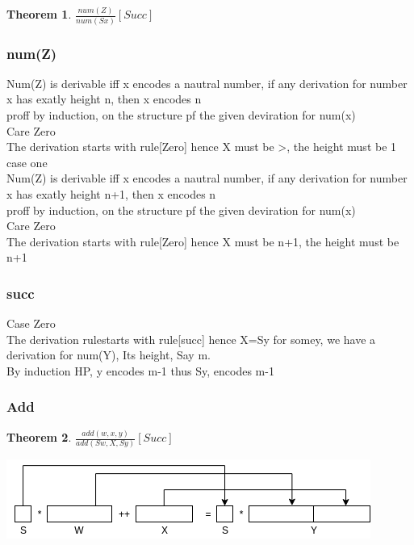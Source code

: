 \documentclass[a4paper,10pt,titlepage]{report}
\newtheorem{theorem}{Theorem}
\begin{document}
\begin{theorem}

$\frac{num(Z)}{num(Sx)}[Succ]$

\end{theorem}
\subsubsection{num(Z)}
Num(Z) is derivable iff x encodes a nautral number, if any derivation for number x has exatly height n, then x encodes n \\
proff by induction, on the structure pf the given deviration for num(x)
\\
\hspace{5mm}
Care Zero\\
The derivation starts with rule[Zero] hence X must be >, the height must be 1
\\ \hspace{5mm}
case one\\
Num(Z) is derivable iff x encodes a nautral number, if any derivation for number x has exatly height n+1, then x encodes n\\
proff by induction, on the structure pf the given deviration for num(x)\\
\hspace{5mm}
Care Zero\\
The derivation starts with rule[Zero] hence X must be n+1, the height must be n+1

\subsubsection{succ}
Case Zero\\

The derivation rulestarts with rule[succ] hence X=Sy for somey, we have a derivation for num(Y), Its height, Say m.\\

By induction HP, y encodes m-1 thus Sy, encodes m-1\\


\subsubsection{Add}
\begin{theorem}

$\frac{add(w,x,y)}{add(Sw, X, Sy)}[Succ]$

\end{theorem}

\includegraphics[scale=0.4]{draw.io/fig1.png}\\
\end{document}
